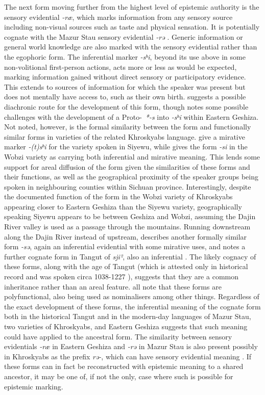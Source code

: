 The next form moving further from the highest level of epistemic authority is the sensory evidential \textit{-ræ}, which marks information from any sensory source including non-visual sources such as taste and physical sensation. It is potentially cognate with the Mazur Stau sensory evidential \textit{-rə} \cite[347]{Gates2021}. Generic information or general world knowledge are also marked with the sensory evidential rather than the egophoric form. The inferential marker \textit{-sʰi}, beyond its use above in some non-volitional first-person actions, acts more or less as would be expected, marking information gained without direct sensory or participatory evidence. This extends to sources of information for which the speaker was present but does not mentally have access to, such as their own birth. \cite[589]{Honkasalo2019} suggests a possible diachronic route for the development of this form, though notes some possible challenges with the development of a Proto-\lfam\ \textit{*-s} into \textit{-sʰi} within Eastern Geshiza. Not noted, however, is the formal similarity between the form and functionally similar forms in varieties of the related Khroskyabs language.  give a mirative marker \textit{-(t)sʰi} for the variety spoken in Siyewu, while  gives the form \textit{-si} in the Wobzi variety as carrying both inferential and mirative meaning. This lends some support for areal diffusion of the form given the similarities of these forms and their functions, as well as the geographical proximity of the speaker groups being spoken in neighbouring counties within Sichuan province. Interestingly, despite the documented function of the form in the Wobzi variety of Khroskyabs appearing closer to Eastern Geshiza than the Siyewu variety, geographically speaking Siyewu appears to be between Geshiza and Wobzi, assuming the Dajin River valley is used as a passage through the mountains. Running downstream along the Dajin River instead of upstream,  describes another formally similar form \textit{-sə}, again an inferential evidential with some mirative uses, and notes a further cognate form in Tangut of \textit{sji²}, also an inferential \cite{Lai2020}. The likely cognacy of these forms, along with the age of Tangut (which is attested only in historical record and was spoken circa 1038-1227 \cite{Lai2020}), suggests that they are a common inheritance rather than an areal feature.  all note that these forms are polyfunctional, also being used as nominalisers among other things. Regardless of the exact development of these forms, the inferential meaning of the cognate form both in the historical Tangut and in the modern-day languages of Mazur Stau, two varieties of Khroskyabs, and Eastern Geshiza suggests that such meaning could have applied to the ancestral form. The similarity between sensory evidentials \textit{-ræ} in Eastern Geshiza and \textit{-rə} in Mazur Stau is also present possibly in Khroskyabs as the prefix \textit{rə-}, which can have sensory evidential meaning \cite{Lai2017}. If these forms can in fact be reconstructed with epistemic meaning to a shared ancestor, it may be one of, if not the only, case where such is possible for epistemic marking.

